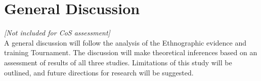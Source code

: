

\chapter{\label{generalDiscussion}General Discussion}

\textit{[Not included for CoS assessment]} \\
A general discussion will follow the analysis of the Ethnographic evidence and  training Tournament. The discussion will make theoretical inferences based on an assessment of results of all three studies.  Limitations of this study will be outlined, and future directions for research will be suggested.

